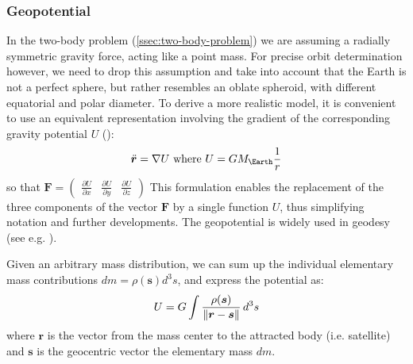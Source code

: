 \subsubsection{Geopotential}\label{sssec:geopotential}

In the two-body problem (\autoref{ssec:two-body-problem}) we are assuming a radially 
symmetric gravity force, acting like a point mass. For precise orbit determination 
however, we need to drop this assumption and take into account that the Earth is 
not a perfect sphere, but rather resembles an oblate spheroid, with different equatorial 
and polar diameter. To derive a more realistic model, it is convenient to use an equivalent 
representation involving the gradient of the corresponding gravity potential $U$ 
(\cite{Montenbruck2000}):
\begin{equation}
  \label{eq:geopotential}
  \ddot{\bm{r}} = \nabla U \textrm{ where } U = G M_{\Earth} \frac{1}{r}
\end{equation}
so that 
$\bm{F} = \begin{pmatrix} \frac{\partial U}{\partial x} & \frac{\partial U}{\partial y} & \frac{\partial U}{\partial z} \end{pmatrix}$
This formulation enables the replacement of the three components of the vector 
$\bm{F}$ by a single function $U$, thus simplifying notation and further 
developments. The geopotential is widely used in geodesy (see e.g. \cite{moritz}).

Given an arbitrary mass distribution, we can sum up the individual elementary 
mass contributions $dm = \rho (\bm{s}) d^3 s$, and express the potential as:
\begin{equation}\label{eq:mont34}
  U = G \int \frac{\rho (\bm{s})}{\lVert\bm{r}-\bm{s}\rVert} \, d^3 s
\end{equation}
where $\bm{r}$ is the vector from the mass center to the attracted body (i.e. satellite) 
and $\bm{s}$ is the geocentric vector the elementary mass $dm$.

